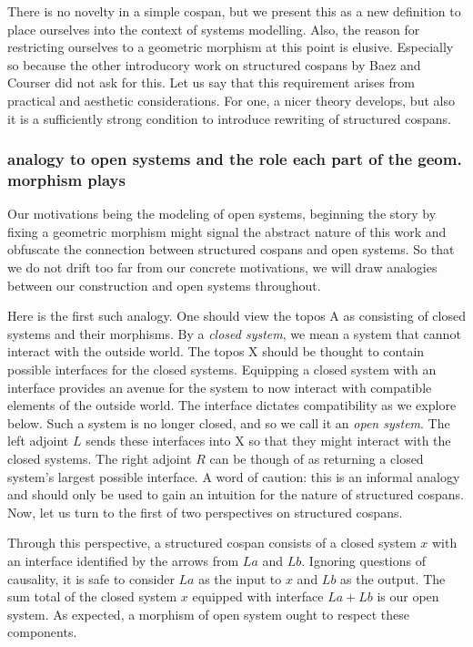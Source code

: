 \documentclass{amsart}
\newcommand{\A}{\cat{A}}
\newcommand{\X}{\cat{X}}
\newcommand{\cat}[1]{\mathrm{#1}}
\theoremstyle{remark}
\theoremstyle{definition}
\begin{document}
There is no novelty in a simple cospan, but we present this as a new
definition to place ourselves into the context of systems
modelling. Also, the reason for restricting ourselves to a geometric
morphism at this point is elusive. Especially so because the other
introducory work on structured cospans by Baez and Courser did not ask
for this. Let us say that this requirement arises from practical and
aesthetic considerations. For one, a nicer theory develops, but also
it is a sufficiently strong condition to introduce rewriting of
structured cospans.

\subsubsection{analogy to open systems and the role each part of the geom. morphism plays}
\label{sec-2-2-2}

Our motivations being the modeling of open systems, beginning
the story by fixing a geometric morphism might signal the abstract
nature of this work and obfuscate the connection between structured
cospans and open systems. So that we do not drift too far from our
concrete motivations, we will draw analogies between our construction
and open systems throughout.  

Here is the first such analogy. One should view the topos $ \A $ as
consisting of closed systems and their morphisms. By a \emph{closed
  system}, we mean a system that cannot interact with the outside
world. The topos $ \X $ should be thought to contain possible
interfaces for the closed systems. Equipping a closed system with an
interface provides an avenue for the system to now interact with
compatible elements of the outside world. The interface dictates
compatibility as we explore below.  Such a system is no longer closed,
and so we call it an \emph{open system}. The left adjoint $ L $ sends
these interfaces into $ \X $ so that they might interact with the
closed systems. The right adjoint $ R $ can be though of as returning
a closed system's largest possible interface. A word of caution: this
is an informal analogy and should only be used to gain an intuition
for the nature of structured cospans. Now, let us turn to the first of
two perspectives on structured cospans.

Through this perspective, a structured cospan consists of a closed
system $ x $ with an interface identified by the arrows from $ La $
and $ Lb $. Ignoring questions of causality, it is safe to consider
$ La $ as the input to $ x $ and $ Lb $ as the output. The sum total
of the closed system $ x $ equipped with interface $ La + Lb $ is our
open system. As expected, a morphism of open system ought to respect
these components.
\end{document}
